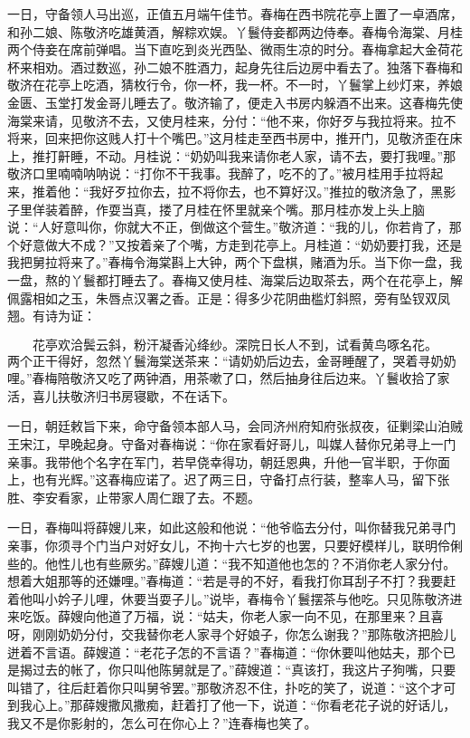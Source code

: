 一日，守备领人马出巡，正值五月端午佳节。春梅在西书院花亭上置了一卓酒席，和孙二娘、陈敬济吃雄黄酒，解粽欢娱。丫鬟侍妾都两边侍奉。春梅令海棠、月桂两个侍妾在席前弹唱。当下直吃到炎光西坠、微雨生凉的时分。春梅拿起大金荷花杯来相劝。酒过数巡，孙二娘不胜酒力，起身先往后边房中看去了。独落下春梅和敬济在花亭上吃酒，猜枚行令，你一杯，我一杯。不一时，丫鬟掌上纱灯来，养娘金匮、玉堂打发金哥儿睡去了。敬济输了，便走入书房内躲酒不出来。这春梅先使海棠来请，见敬济不去，又使月桂来，分付：“他不来，你好歹与我拉将来。拉不将来，回来把你这贱人打十个嘴巴。”这月桂走至西书房中，推开门，见敬济歪在床上，推打鼾睡，不动。月桂说：“奶奶叫我来请你老人家，请不去，要打我哩。”那敬济口里喃喃呐呐说：“打你不干我事。我醉了，吃不的了。”被月桂用手拉将起来，推着他：“我好歹拉你去，拉不将你去，也不算好汉。”推拉的敬济急了，黑影子里佯装着醉，作耍当真，搂了月桂在怀里就亲个嘴。那月桂亦发上头上脑说：“人好意叫你，你就大不正，倒做这个营生。”敬济道：“我的儿，你若肯了，那个好意做大不成？”又按着亲了个嘴，方走到花亭上。月桂道：“奶奶要打我，还是我把舅拉将来了。”春梅令海棠斟上大钟，两个下盘棋，赌酒为乐。当下你一盘，我一盘，熬的丫鬟都打睡去了。春梅又使月桂、海棠后边取茶去，两个在花亭上，解佩露相如之玉，朱唇点汉署之香。正是：得多少花阴曲槛灯斜照，旁有坠钗双凤翘。有诗为证：

\[
花亭欢洽鬓云斜，粉汗凝香沁绛纱。
深院日长人不到，试看黄鸟啄名花。
\]
两个正干得好，忽然丫鬟海棠送茶来：“请奶奶后边去，金哥睡醒了，哭着寻奶奶哩。”春梅陪敬济又吃了两钟酒，用茶嗽了口，然后抽身往后边来。丫鬟收拾了家活，喜儿扶敬济归书房寝歇，不在话下。

一日，朝廷敕旨下来，命守备领本部人马，会同济州府知府张叔夜，征剿梁山泊贼王宋江，早晚起身。守备对春梅说：“你在家看好哥儿，叫媒人替你兄弟寻上一门亲事。我带他个名字在军门，若早侥幸得功，朝廷恩典，升他一官半职，于你面上，也有光辉。”这春梅应诺了。迟了两三日，守备打点行装，整率人马，留下张胜、李安看家，止带家人周仁跟了去。不题。

一日，春梅叫将薛嫂儿来，如此这般和他说：“他爷临去分付，叫你替我兄弟寻门亲事，你须寻个门当户对好女儿，不拘十六七岁的也罢，只要好模样儿，联明伶俐些的。他性儿也有些厥劣。”薛嫂儿道：“我不知道他也怎的？不消你老人家分付。想着大姐那等的还嫌哩。”春梅道：“若是寻的不好，看我打你耳刮子不打？我要赶着他叫小妗子儿哩，休要当耍子儿。”说毕，春梅令丫鬟摆茶与他吃。只见陈敬济进来吃饭。薛嫂向他道了万福，说：“姑夫，你老人家一向不见，在那里来？且喜呀，刚刚奶奶分付，交我替你老人家寻个好娘子，你怎么谢我？”那陈敬济把脸儿迸着不言语。薛嫂道：“老花子怎的不言语？”春梅道：“你休要叫他姑夫，那个已是揭过去的帐了，你只叫他陈舅就是了。”薛嫂道：“真该打，我这片子狗嘴，只要叫错了，往后赶着你只叫舅爷罢。”那敬济忍不住，扑吃的笑了，说道：“这个才可到我心上。”那薛嫂撒风撒痴，赶着打了他一下，说道：“你看老花子说的好话儿，我又不是你影射的，怎么可在你心上？”连春梅也笑了。


